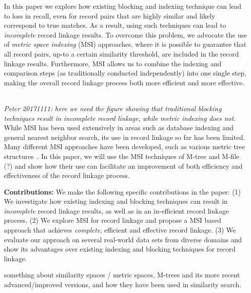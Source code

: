 \documentclass{llncs}
\begin{document}
In this paper we explore how existing blocking and indexing technique
can lead to loss in recall, even for record pairs that are highly
similar and likely correspond to true matches. As a result, using
such techniques can lead to \emph{incomplete} record linkage
results. To overcome this problem, we advocate the use of
\emph{metric space indexing} (MSI) approaches, where it is possible to
guarantee that all record pairs, up-to a certain similarity threshold,
are included in the record linkage results. Furthermore, MSI allows
us to combine the indexing and comparison steps (as traditionally
conducted independently) into one single step, making the overall
record linkage process both more efficient and more effective.


~ \\
\emph{Peter 20171111: here we need the figure showing that traditional
blocking techniques result in incomplete record linkage, while metric
indexing does not.}
~ \\

While MSI has been used extensively in areas such as database indexing
and general nearest neighbor search, its use in record linkage so far
has been limited. 
Many different MSI approaches have been developed, such as various
metric tree structures~\cite{}. 
In this paper, we will use the MSI techniques of M-tree and M-file (?)
and show how their use can facilitate an improvement of both
efficiency and effectiveness of the record linkage process.

\smallskip
\textbf{Contributions:} We make the following specific contributions
in the paper: (1) We investigate how existing indexing and blocking
techniques can result in \emph{incomplete} record linkage results,
as well as in an in-efficient record linkage process. (2) We explore
MSI for record linkage and propose a MSI based approach that achieves
\emph{complete}, efficient and effective record linkage. (3) We
evaluate our approach on several real-world data sets from diverse
domains and show its advantages over existing indexing and
blocking techniques for record linkage.



something about similarity spaces / metric spaces, M-trees and its
more recent advanced/improved versions, and how they have been used in
similarity search.
\end{document}
